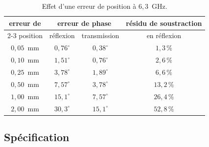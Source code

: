 \documentclass[11pt,a4paper]{article}
\begin{document}
\begin{table}[H]
\centering
\begin{tabular}{cccc}
\toprule
erreur de & \multicolumn{2}{c}{erreur de phase} & résidu de soustraction \\
\cmidrule(lr){2-3}
position & réflexion & transmission & en réflexion \\
\midrule
$0{,}05$~mm & $0{,}76^\circ$ & $0{,}38^\circ$ & $1{,}3\,\%$ \\
$0{,}10$~mm & $1{,}51^\circ$ & $0{,}76^\circ$ & $2{,}6\,\%$ \\
$0{,}25$~mm & $3{,}78^\circ$ & $1{,}89^\circ$ & $6{,}6\,\%$ \\
$0{,}50$~mm & $7{,}57^\circ$ & $3{,}78^\circ$ & $13{,}2\,\%$ \\
$1{,}00$~mm & $15{,}1^\circ$ & $7{,}57^\circ$ & $26{,}4\,\%$ \\
$2{,}00$~mm & $30{,}3^\circ$ & $15{,}1^\circ$ & $52{,}8\,\%$ \\
\bottomrule
\end{tabular}
\caption{Effet d'une erreur de position à $6{,}3$~GHz.}
\label{tab:phase}
\end{table}

\subsection{Spécification}
\end{document}
